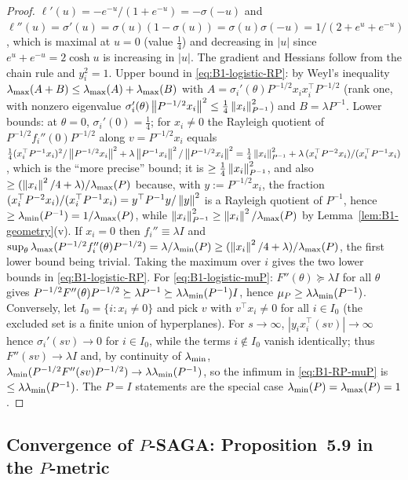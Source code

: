 \begin{proof}
$\ell'(u)=-e^{-u}/(1+e^{-u})=-\sigma(-u)$ and $\ell''(u)=\sigma'(u)=\sigma(u)(1-\sigma(u))=\sigma(u)\sigma(-u)
=1/(2+e^u+e^{-u})$, which is maximal at $u=0$ (value $\frac14$) and decreasing in $|u|$ since
$e^u+e^{-u}=2\cosh u$ is increasing in $|u|$. The gradient and Hessians follow from the chain rule and
$y_i^2=1$. Upper bound in \eqref{eq:B1-logistic-RP}: by Weyl's inequality
$\lambda_{\max}(A+B)\le\lambda_{\max}(A)+\lambda_{\max}(B)$ with $A=\sigma_i'(\theta)P^{-1/2}x_ix_i^\top P^{-1/2}$ (rank one, with
nonzero eigenvalue $\sigma_i'(\theta)\left\|P^{-1/2}x_i\right\|^2\le\frac14\left\|x_i\right\|_{P^{-1}}^2$) and
$B=\lambda P^{-1}$. Lower bounds: at $\theta=0$, $\sigma_i'(0)=\frac14$; for $x_i\neq0$ the Rayleigh
quotient of $P^{-1/2}f_i''(0)P^{-1/2}$ along $v=P^{-1/2}x_i$ equals
$\frac14(x_i^\top P^{-1}x_i)^2/\left\|P^{-1/2}x_i\right\|^2+\lambda\left\|P^{-1}x_i\right\|^2/\left\|P^{-1/2}x_i\right\|^2
=\frac14\left\|x_i\right\|_{P^{-1}}^2+\lambda\,(x_i^\top P^{-2}x_i)/(x_i^\top P^{-1}x_i)$, which is the ``more
precise'' bound; it is $\ge\frac14\left\|x_i\right\|_{P^{-1}}^2$, and also $\ge(\left\|x_i\right\|^2/4+\lambda)/\lambda_{\max}(P)$
because, with $y:=P^{-1/2}x_i$, the fraction $(x_i^\top P^{-2}x_i)/(x_i^\top P^{-1}x_i)=y^\top P^{-1}y/\left\|y\right\|^2$
is a Rayleigh quotient of $P^{-1}$, hence $\ge\lambda_{\min}(P^{-1})=1/\lambda_{\max}(P)$, while
$\left\|x_i\right\|_{P^{-1}}^2\ge\left\|x_i\right\|^2/\lambda_{\max}(P)$ by Lemma~\ref{lem:B1-geometry}(v). If $x_i=0$ then
$f_i''\equiv\lambda I$ and $\sup_\theta\lambda_{\max}(P^{-1/2}f_i''(\theta)P^{-1/2})=\lambda/\lambda_{\min}(P)\ge(\left\|x_i\right\|^2/4+\lambda)/\lambda_{\max}(P)$,
the first lower bound being trivial. Taking the maximum over $i$ gives the two lower bounds in
\eqref{eq:B1-logistic-RP}.
For \eqref{eq:B1-logistic-muP}: $F''(\theta)\succeq\lambda I$ for all $\theta$ gives
$P^{-1/2}F''(\theta)P^{-1/2}\succeq\lambda P^{-1}\succeq\lambda\lambda_{\min}(P^{-1})I$, hence
$\mu_P\ge\lambda\lambda_{\min}(P^{-1})$. Conversely, let $I_0=\{i:x_i\neq0\}$ and pick $v$ with $v^\top x_i\neq0$
for all $i\in I_0$ (the excluded set is a finite union of hyperplanes). For $s\to\infty$,
$|y_ix_i^\top(sv)|\to\infty$ hence $\sigma_i'(sv)\to0$ for $i\in I_0$, while the terms $i\notin I_0$
vanish identically; thus $F''(sv)\to\lambda I$ and, by continuity of $\lambda_{\min}$,
$\lambda_{\min}(P^{-1/2}F''(sv)P^{-1/2})\to\lambda\lambda_{\min}(P^{-1})$, so the infimum in \eqref{eq:B1-RP-muP} is
$\le\lambda\lambda_{\min}(P^{-1})$. The $P=I$ statements are the special case $\lambda_{\min}(P)=\lambda_{\max}(P)=1$.
\end{proof}

\subsection{Convergence of \texorpdfstring{$P$}{P}-SAGA: Proposition~5.9 in the \texorpdfstring{$P$}{P}-metric}
\label{sec:B1-rate}

